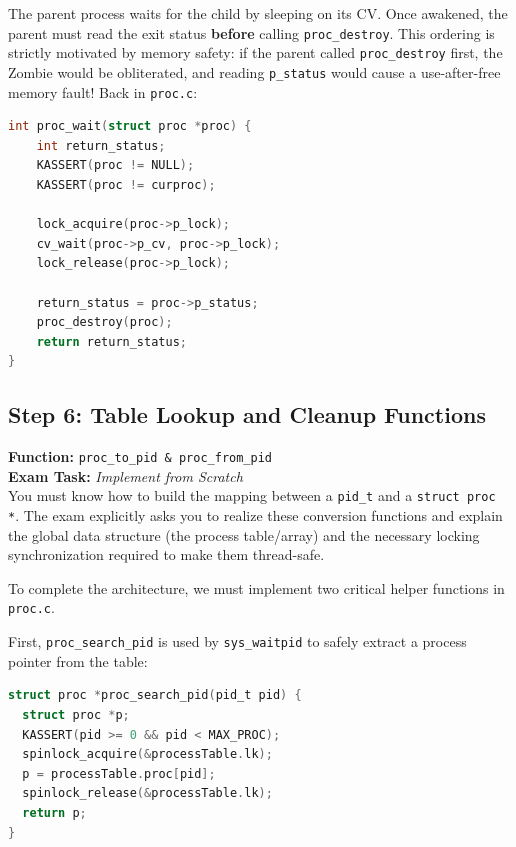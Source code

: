 The parent process waits for the child by sleeping on its CV. Once awakened, the parent must read the exit status \textbf{before} calling \texttt{proc\_destroy}. This ordering is strictly motivated by memory safety: if the parent called \texttt{proc\_destroy} first, the Zombie would be obliterated, and reading \texttt{p\_status} would cause a use-after-free memory fault! Back in \texttt{proc.c}:
\begin{lstlisting}[language=C]
int proc_wait(struct proc *proc) {
    int return_status;
    KASSERT(proc != NULL);
    KASSERT(proc != curproc);

    lock_acquire(proc->p_lock);
    cv_wait(proc->p_cv, proc->p_lock);
    lock_release(proc->p_lock);

    return_status = proc->p_status;
    proc_destroy(proc);
    return return_status;
}
\end{lstlisting}

\subsection{Step 6: Table Lookup and Cleanup Functions}

\begin{tcolorbox}[colback=red!5!white, colframe=red!75!black, title=\textbf{! EXAM FOCUS: IMPLEMENTATION REQUIRED}]
\textbf{Function:} \texttt{proc\_to\_pid \& proc\_from\_pid} \\
\textbf{Exam Task:} \textit{Implement from Scratch} \\
You must know how to build the mapping between a \texttt{pid\_t} and a \texttt{struct proc *}. The exam explicitly asks you to realize these conversion functions and explain the global data structure (the process table/array) and the necessary locking synchronization required to make them thread-safe.
\end{tcolorbox}

To complete the architecture, we must implement two critical helper functions in \texttt{proc.c}. 

First, \texttt{proc\_search\_pid} is used by \texttt{sys\_waitpid} to safely extract a process pointer from the table:
\begin{lstlisting}[language=C]
struct proc *proc_search_pid(pid_t pid) {
  struct proc *p;
  KASSERT(pid >= 0 && pid < MAX_PROC);
  spinlock_acquire(&processTable.lk);
  p = processTable.proc[pid];
  spinlock_release(&processTable.lk);
  return p;
}
\end{lstlisting}

